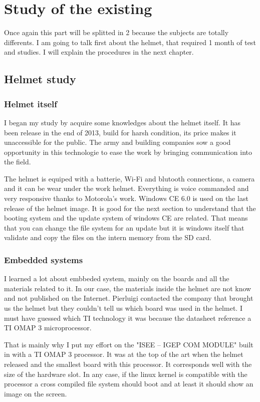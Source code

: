 \chapter[Studies]{Study of the existing}
Once again this part will be splitted in 2 because the subjects are totally differents. I am going to talk first about the helmet, that required 1 month of test and studies. I will explain the procedures in the next chapter. 
	
	\section{Helmet study}	
	\subsection{Helmet itself}
	\par I began my study by acquire some knowledges about the helmet itself. It has been release in the end of 2013, build for harsh condition, its price makes it unaccessible for the public. The army and building companies sow a good opportunity in this technologie to ease the work by bringing communication into the field.
	\par The helmet is equiped with a batterie, Wi-Fi and blutooth connections, a camera and it can be wear under the work helmet. Everything is voice commanded and very responsive thanks to Motorola's work. Windows CE 6.0 is used on the last release of the helmet image. It is good for the next section to understand that the booting system and the update system of windows CE are related. That means that you can change the file system for an update but it is windows itself that validate and copy the files on the intern memory from the SD card.
	\subsection{Embedded systems}
	\par I learned a lot about embbeded system, mainly on the boards and all the materials related to it. In our case, the materials inside the helmet are not know and not published on the Internet. Pierluigi contacted the company that brought us the helmet but they couldn't tell us which board was used in the helmet. I must have guessed which TI technology it was because the datasheet reference a TI OMAP 3 microprocessor. 
	\par That is mainly why I put my effort on the "ISEE – IGEP COM MODULE" built in with a TI OMAP 3 processor. It was at the top of the art when the helmet released and the smallest board with this processor. It corresponds well with the size of the hardware slot. In any case, if the linux kernel is compatible with the processor a cross compiled file system should boot and at least it should show an image on the screen.
	
